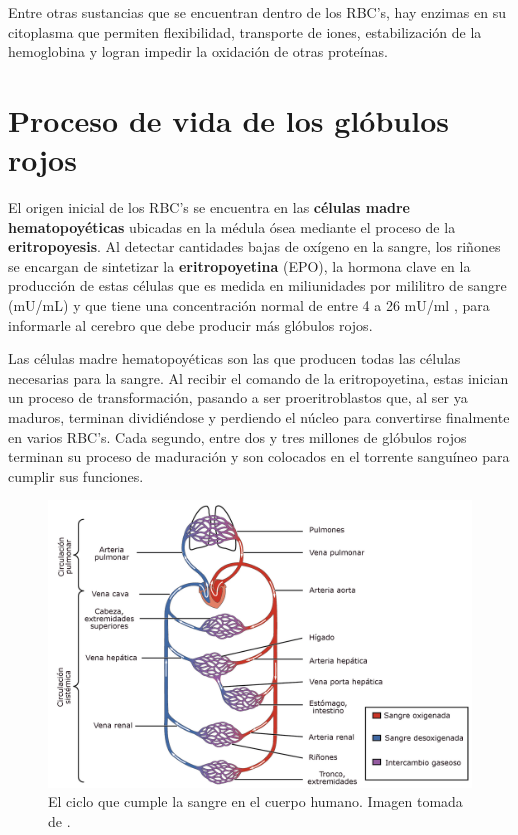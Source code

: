 Entre otras sustancias que se encuentran dentro de los RBC's, hay enzimas en su citoplasma que permiten flexibilidad, transporte de iones, estabilización de la hemoglobina y logran impedir la oxidación de otras proteínas.

\section{Proceso de vida de los glóbulos rojos}\label{sec:RBC:vida}

El origen inicial de los RBC's se encuentra en las \textbf{células madre hematopoyéticas} ubicadas en la médula ósea mediante el proceso de la \textbf{eritropoyesis}. Al detectar cantidades bajas de oxígeno en la sangre, los riñones se encargan de sintetizar la \textbf{eritropoyetina} (EPO), la hormona clave en la producción de estas células que es medida en miliunidades por mililitro de sangre (mU/mL) y que tiene una concentración normal de entre 4 a 26 mU/ml , para informarle al cerebro que debe producir más glóbulos rojos. 

Las células madre hematopoyéticas son las que producen todas las células necesarias para la sangre. Al recibir el comando de la eritropoyetina, estas inician un proceso de transformación, pasando a ser proeritroblastos que, al ser ya maduros, terminan dividiéndose y perdiendo el núcleo para convertirse finalmente en varios RBC's. Cada segundo, entre dos y tres millones de glóbulos rojos terminan su proceso de maduración y son colocados en el torrente sanguíneo para cumplir sus funciones.

\begin{figure}[H]
    \centering
    \includegraphics[scale=0.2]{figures/CicloSangre.jpg}
    \caption{El ciclo que cumple la sangre en el cuerpo humano. Imagen tomada de \cite{eswiki:159489943}.}
    \label{sec:RBC:fig:CicloSangre}
\end{figure}

